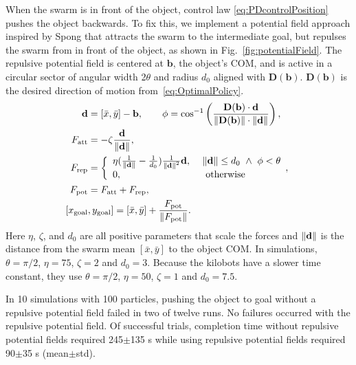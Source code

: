 When the swarm is in front of the object, control law \eqref{eq:PDcontrolPosition} pushes the object backwards.  To fix this, we implement a potential field approach inspired by Spong \cite{spong2008robot} that attracts the swarm to the intermediate goal, but repulses the swarm from in front of the object, as shown in Fig.~\ref{fig:potentialField}.
The repulsive potential field is centered at $\mathbf{b}$, the object's COM, and is active in a circular sector of angular width 2$\theta$ and radius $d_0$ aligned with $\mathbf{D}(\mathbf{b})$. $\mathbf{D}(\mathbf{b})$ is the desired direction of motion from~\eqref{eq:OptimalPolicy}.
\begin{align}
\mathbf{d} &=  [\bar{x},\bar{y}] - \mathbf{b}, \qquad   \phi =\cos^{-1}\left( \frac{ \mathbf{D}(\mathbf{b}) \cdot  \mathbf{d}  }{\norm{\mathbf{D}(\mathbf{b})} \cdot \norm{\mathbf{d}} } \right), \nonumber \\ 
F_{\rm{att}} &= -\zeta \frac{\mathbf{d}  }{ \norm{\mathbf{d}}}, \nonumber\\
 F_{\rm{rep}} &=  \left\{
\begin{array}{ll}
      \eta( \frac{1}{\norm{\mathbf{d}}}- \frac{1}{d_0}) \frac{1}{\norm{\mathbf{d}}^2} \mathbf{d}, ~& \norm{\mathbf{d}} \leq d_0~\wedge~\phi <  \theta \\
      0, & \textrm{ otherwise} \nonumber \\
\end{array},
\right.\\
F_{\rm{pot}} &= F_{\rm{att}} + F_{\rm{rep}} \label{eq:potentialfield}, \nonumber\\
[x_{\rm{goal}}&, y_{\rm{goal}}] =  [\bar{x},\bar{y}]  + \frac{F_{\rm{pot}}}{\norm{F_{\rm{pot}}}}.
\end{align}
Here  $\eta$, $\zeta$, and $d_0$ are all positive parameters that scale the forces and $\left\lVert\mathbf{d}\right\rVert$ is the distance from the swarm mean $ [\bar{x},\bar{y}]$ to the object COM.
In simulations, $\theta =  \pi/2$,  $\eta  = 75$, $\zeta = 2$ and $d_0 = 3$. Because the kilobots have a slower time constant, they use $\theta =  \pi/2$,  $\eta  = 50$, $\zeta = 1$ and $d_0 = 7.5$. 

In 10 simulations with 100 particles, pushing the object to goal without a repulsive potential field failed in two of twelve runs. No failures occurred with the repulsive potential field.  Of successful trials, completion time without repulsive potential fields required 245$\pm$135 s while using repulsive potential fields required 90$\pm$35 s (mean$\pm$std).

